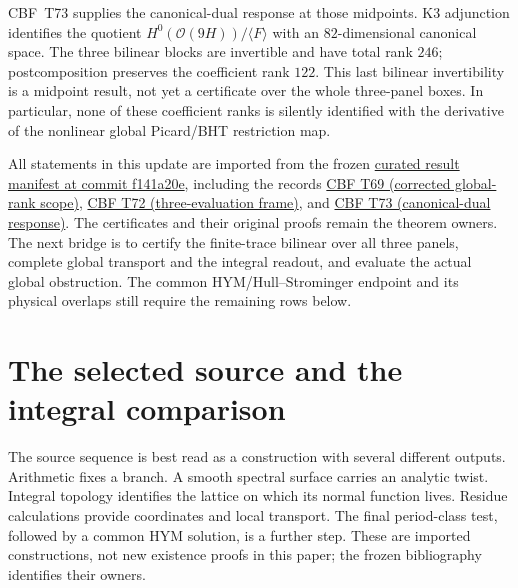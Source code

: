 \documentclass[11pt]{article}
\theoremstyle{definition}
\theoremstyle{remark}
\begin{document}
CBF~T73 supplies the canonical-dual response at those midpoints.
K3 adjunction identifies the quotient
$H^0(\mathcal O(9H))/\langle F\rangle$ with an $82$-dimensional canonical
space. The three bilinear blocks are invertible and have total rank $246$;
postcomposition preserves the coefficient rank $122$. This last bilinear
invertibility is a midpoint result, not yet a certificate over the whole
three-panel boxes. In particular, none of these coefficient ranks is
silently identified with the derivative of the nonlinear global
Picard/BHT restriction map.

All statements in this update are imported from the frozen
\href{https://github.com/PeterNero/mtt-results-repro/blob/f141a20ea23c5c3ff19cc2161c0e226e29ade8a7/release/result_manifest.json}{curated result manifest at commit f141a20e},
including the records
\href{https://github.com/PeterNero/mtt-results-repro/blob/f141a20ea23c5c3ff19cc2161c0e226e29ade8a7/release/results/q79_eta9_framed_member_spectral_rank_exclusion/artifact.json}{CBF T69 (corrected global-rank scope)},
\href{https://github.com/PeterNero/mtt-results-repro/blob/f141a20ea23c5c3ff19cc2161c0e226e29ade8a7/release/results/q79_eta9_physical_midpoint_three_evaluation_frame/artifact.json}{CBF T72 (three-evaluation frame)}, and
\href{https://github.com/PeterNero/mtt-results-repro/blob/f141a20ea23c5c3ff19cc2161c0e226e29ade8a7/release/results/q79_eta9_physical_canonical_dual_response_observability/artifact.json}{CBF T73 (canonical-dual response)}.
The certificates and their original proofs remain the theorem owners.
The next bridge is to certify the finite-trace bilinear over all three
panels, complete global transport and the integral readout, and evaluate
the actual global obstruction. The common HYM/Hull--Strominger endpoint
and its physical overlaps still require the remaining rows below.

\section{The selected source and the integral comparison}
\label{sec:source-integral}

The source sequence is best read as a construction with several different
outputs. Arithmetic fixes a branch. A smooth spectral surface carries an
analytic twist. Integral topology identifies the lattice on which its
normal function lives. Residue calculations provide coordinates and local
transport. The final period-class test, followed by a common HYM solution,
is a further step. These are imported constructions, not new existence
proofs in this paper; the frozen bibliography identifies their owners.
\end{document}
